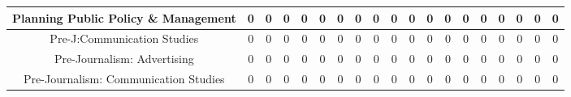 \documentclass[10pt]{article}
\begin{document}
\begin{landscape}
\begin{longtable}[c]{|ccccccccccccccccccc|}
	\multicolumn{1}{|c|}{Planning Public Policy \& Management}       & \multicolumn{1}{c|}{0}          & \multicolumn{1}{c|}{0}          & \multicolumn{1}{c|}{0}          & \multicolumn{1}{c|}{0}          & \multicolumn{1}{c|}{0}          & \multicolumn{1}{c|}{0}          & \multicolumn{1}{c|}{0}          & \multicolumn{1}{c|}{0}          & \multicolumn{1}{c|}{0}          & \multicolumn{1}{c|}{0}          & \multicolumn{1}{c|}{0}          & \multicolumn{1}{c|}{0}          & \multicolumn{1}{c|}{0}          & \multicolumn{1}{c|}{0}          & \multicolumn{1}{c|}{0}          & \multicolumn{1}{c|}{0}          & \multicolumn{1}{c|}{0}          & 0          \\ \hline
	\multicolumn{1}{|c|}{Pre-J:Communication Studies}                & \multicolumn{1}{c|}{0}          & \multicolumn{1}{c|}{0}          & \multicolumn{1}{c|}{0}          & \multicolumn{1}{c|}{0}          & \multicolumn{1}{c|}{0}          & \multicolumn{1}{c|}{0}          & \multicolumn{1}{c|}{0}          & \multicolumn{1}{c|}{0}          & \multicolumn{1}{c|}{0}          & \multicolumn{1}{c|}{0}          & \multicolumn{1}{c|}{0}          & \multicolumn{1}{c|}{0}          & \multicolumn{1}{c|}{0}          & \multicolumn{1}{c|}{0}          & \multicolumn{1}{c|}{0}          & \multicolumn{1}{c|}{0}          & \multicolumn{1}{c|}{0}          & 0          \\ \hline
	\multicolumn{1}{|c|}{Pre-Journalism: Advertising}                & \multicolumn{1}{c|}{0}          & \multicolumn{1}{c|}{0}          & \multicolumn{1}{c|}{0}          & \multicolumn{1}{c|}{0}          & \multicolumn{1}{c|}{0}          & \multicolumn{1}{c|}{0}          & \multicolumn{1}{c|}{0}          & \multicolumn{1}{c|}{0}          & \multicolumn{1}{c|}{0}          & \multicolumn{1}{c|}{0}          & \multicolumn{1}{c|}{0}          & \multicolumn{1}{c|}{0}          & \multicolumn{1}{c|}{0}          & \multicolumn{1}{c|}{0}          & \multicolumn{1}{c|}{0}          & \multicolumn{1}{c|}{0}          & \multicolumn{1}{c|}{0}          & 0          \\ \hline
	\multicolumn{1}{|c|}{Pre-Journalism: Communication Studies}      & \multicolumn{1}{c|}{0}          & \multicolumn{1}{c|}{0}          & \multicolumn{1}{c|}{0}          & \multicolumn{1}{c|}{0}          & \multicolumn{1}{c|}{0}          & \multicolumn{1}{c|}{0}          & \multicolumn{1}{c|}{0}          & \multicolumn{1}{c|}{0}          & \multicolumn{1}{c|}{0}          & \multicolumn{1}{c|}{0}          & \multicolumn{1}{c|}{0}          & \multicolumn{1}{c|}{0}          & \multicolumn{1}{c|}{0}          & \multicolumn{1}{c|}{0}          & \multicolumn{1}{c|}{0}          & \multicolumn{1}{c|}{0}          & \multicolumn{1}{c|}{0}          & 0          \\ \hline

\end{longtable}
\end{landscape}
\end{document}
